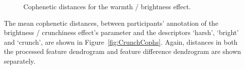 			\begin{figure}[h!]
				\centering
				\quad
				\caption{Cophenetic distances for the warmth / brightness effect.}
				\label{fig:HarshCophs}
			\end{figure}

			The mean cophenetic distances, between participants' annotation of the brightness / crunchiness
			effect's parameter and the descriptors `harsh', `bright' and `crunch', are shown in
			Figure~\ref{fig:CrunchCophs}. Again, distances in both the processed feature dendrogram and feature
			difference dendrogram are shown separately.

